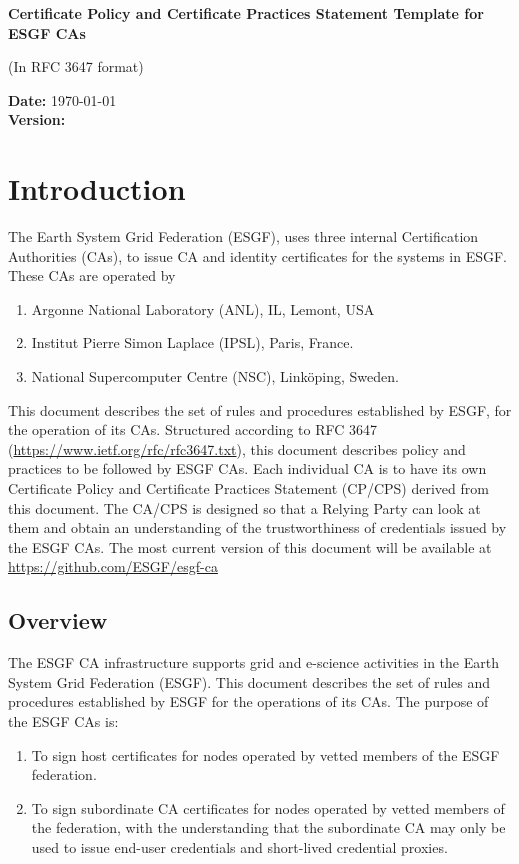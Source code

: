 \textbf{Certificate Policy and Certificate Practices Statement Template for ESGF CAs}

(In RFC 3647 format)

\textbf{Date:} \today\\
\textbf{Version:} \versionnum

\section{Introduction}\label{introduction}

The Earth System Grid Federation (ESGF), uses three internal Certification Authorities (CAs), to issue CA and identity certificates for the systems in ESGF.
These CAs are operated by
\begin{enumerate}
\item Argonne National Laboratory (ANL), IL, Lemont, USA
\item Institut Pierre Simon Laplace (IPSL), Paris, France.
\item National Supercomputer Centre (NSC), Link\"oping, Sweden.
\end{enumerate}
This document describes the set of rules and procedures established by ESGF, for the operation of its CAs. Structured according to RFC 3647 (\url{https://www.ietf.org/rfc/rfc3647.txt}), this document describes policy and practices to be followed by ESGF CAs. Each individual CA is to have its own Certificate Policy and Certificate Practices Statement (CP/CPS) derived from this document.
The CA/CPS is designed so that a Relying Party can look at them and obtain an understanding of the trustworthiness of credentials issued by the ESGF CAs. The most current version of this document will be available at \url{https://github.com/ESGF/esgf-ca}

\subsection{Overview}\label{overview}

The ESGF CA infrastructure supports grid and e-science activities in
the Earth System Grid Federation (ESGF). This document describes the
set of rules and procedures established by ESGF for the operations of its CAs. The purpose of the ESGF CAs is:

\begin{enumerate}
\item
  
  To sign host certificates for nodes operated by vetted members of the ESGF federation.
  
\item
  
  To sign subordinate CA certificates for nodes operated by vetted members of the federation, with the understanding that the subordinate CA may only be used to issue end-user credentials and short-lived credential proxies. 
  
\end{enumerate}

